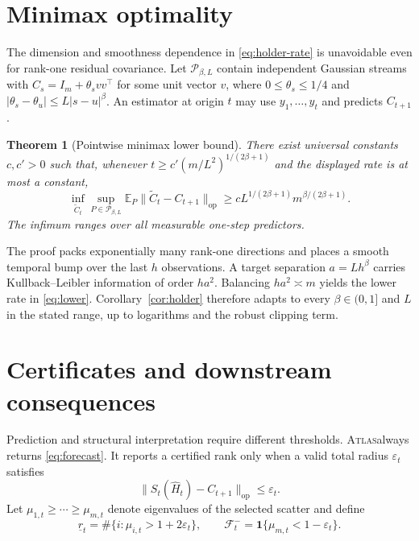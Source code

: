 \documentclass{article}
\newtheorem{theorem}{Theorem}
\theoremstyle{definition}
\theoremstyle{remark}
\newcommand{\E}{\mathbb{E}}
\newcommand{\op}{\mathrm{op}}
\newcommand{\ind}{\mathbf{1}}
\newcommand{\eps}{\varepsilon}
\newcommand{\ATLAS}{\textsc{Atlas}}
\begin{document}
\section{Minimax optimality}
\label{sec:lower}

The dimension and smoothness dependence in \eqref{eq:holder-rate} is unavoidable even for rank-one residual covariance. Let $\mathcal P_{\beta,L}$ contain independent Gaussian streams with
$C_s=I_m+\theta_svv^\top$ for some unit vector $v$, where $0\le\theta_s\le1/4$ and
$|\theta_s-\theta_u|\le L|s-u|^\beta$. An estimator at origin $t$ may use $y_1,\ldots,y_t$ and predicts $C_{t+1}$.

\begin{theorem}[Pointwise minimax lower bound]
\label{thm:lower}
There exist universal constants $c,c'>0$ such that, whenever
$t\ge c'(m/L^2)^{1/(2\beta+1)}$ and the displayed rate is at most a constant,
\begin{equation}
 \inf_{\widetilde C_t}\sup_{P\in\mathcal P_{\beta,L}}
 \E_P\|\widetilde C_t-C_{t+1}\|_{\op}
 \ge cL^{1/(2\beta+1)}m^{\beta/(2\beta+1)}.
 \label{eq:lower}
\end{equation}
The infimum ranges over all measurable one-step predictors.
\end{theorem}

The proof packs exponentially many rank-one directions and places a smooth temporal bump over the last $h$ observations. A target separation $a=Lh^\beta$ carries Kullback--Leibler information of order $ha^2$. Balancing $ha^2\asymp m$ yields the lower rate in \eqref{eq:lower}. Corollary~\ref{cor:holder} therefore adapts to every $\beta\in(0,1]$ and $L$ in the stated range, up to logarithms and the robust clipping term.

\section{Certificates and downstream consequences}
\label{sec:certificates}

Prediction and structural interpretation require different thresholds. \ATLAS always returns \eqref{eq:forecast}. It reports a certified rank only when a valid total radius $\eps_t$ satisfies
\begin{equation}
 \|S_t(\widehat H_t)-C_{t+1}\|_{\op}\le\eps_t.
 \label{eq:total-radius}
\end{equation}
Let $\mu_{1,t}\ge\cdots\ge\mu_{m,t}$ denote eigenvalues of the selected scatter and define
\begin{equation}
 \underline r_t=\#\{i:\mu_{i,t}>1+2\eps_t\},
 \qquad
 \mathcal F_t^-=\ind\{\mu_{m,t}<1-\eps_t\}.
 \label{eq:certificates}
\end{equation}
\end{document}
